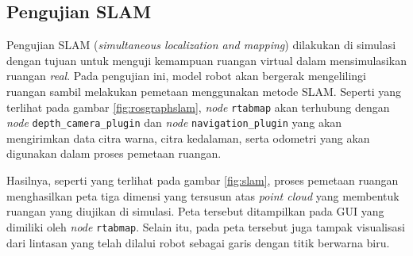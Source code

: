 \subsection{Pengujian SLAM}
\label{subsec:slamtesting}



Pengujian SLAM (\emph{simultaneous localization and mapping}) dilakukan di simulasi dengan tujuan untuk menguji kemampuan ruangan virtual dalam mensimulasikan ruangan \emph{real}.
Pada pengujian ini,
  model robot akan bergerak mengelilingi ruangan sambil melakukan pemetaan menggunakan metode SLAM.
Seperti yang terlihat pada gambar \ref{fig:rosgraphslam},
  \emph{node} \lstinline{rtabmap} akan terhubung dengan \emph{node} \lstinline{depth_camera_plugin} dan \emph{node} \lstinline{navigation_plugin} yang akan mengirimkan data citra warna, citra kedalaman, serta odometri yang akan digunakan dalam proses pemetaan ruangan.



Hasilnya,
  seperti yang terlihat pada gambar \ref{fig:slam},
  proses pemetaan ruangan menghasilkan peta tiga dimensi yang tersusun atas \emph{point cloud} yang membentuk ruangan yang diujikan di simulasi.
Peta tersebut ditampilkan pada GUI yang dimiliki oleh \emph{node} \lstinline{rtabmap}.
Selain itu,
  pada peta tersebut juga tampak visualisasi dari lintasan yang telah dilalui robot sebagai garis dengan titik berwarna biru.

